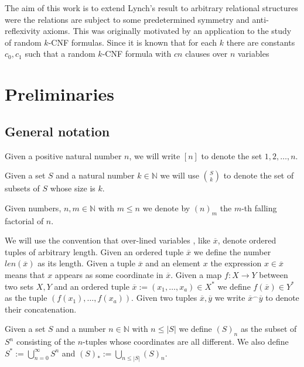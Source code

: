 \documentclass[12pt,notitlepage,a4paper]{article}
\theoremstyle{definition}
\newcommand{\N}{\mathbb{N}}
\begin{document}
The aim of this work is to extend Lynch's result to arbitrary 
relational structures were the relations are subject to some
predetermined symmetry and anti-reflexivity axioms. This was 
originally motivated by an application to the study of random
$k$-CNF formulas. Since \cite{chvatal1992mick} it is known that 
for each $k$ there are constants $c_0,c_1$ such that a random 
$k$-CNF formula with $cn$ clauses over $n$ variables 

% 





\setcounter{section}{0}

\section{Preliminaries}

\subsection{General notation}\label{subsect:notation}

Given a positive natural number $n$, we will write
$[n]$ to denote the set ${1,2,\dots,n}$.\par
Given a set $S$ and a natural number $k\in \N$
we will use $\binom{S}{k}$ to denote the set of 
subsets of $S$ whose size is $k$. \par
Given numbers, $n,m\in \N$ with $m\leq n$ we denote by
$(n)_m$ the $m$-th falling factorial of $n$. \par
We will use the convention that over-lined variables
, like $\overline{x}$, denote ordered tuples of arbitrary length.
Given an ordered tuple $\overline{x}$
we define the number $len(\overline{x})$ as its length. 
Given a tuple $\overline{x}$ and an element $x$ the expression
$x\in \overline{x}$ means that $x$ appears as some coordinate
in $\overline{x}$. 
Given a map $f:X\rightarrow Y$ between two sets $X, Y$ and 
an ordered tuple $\overline{x}:=(x_1,\dots,x_a)\in X^*$ 
we define $f(\overline{x})\in Y^*$ as the tuple 
$(f(x_1),\dots,f(x_a))$.
Given two tuples $\overline{x},\overline{y}$
we write $\overline{x}^\smallfrown \overline{y}$ to denote their 
concatenation.
\par

Given a set
$S$ and a number $n\in \N$ with $n\leq |S|$ we define
$(S)_n$ as the subset of $S^n$ consisting of the $n$-tuples
whose coordinates are all different. 
We also define $S^*:=\bigcup_{n=0}^\infty S^n$ and
$(S)_*:=\bigcup_{n\leq |S|} (S)_n$. \par
\end{document}
